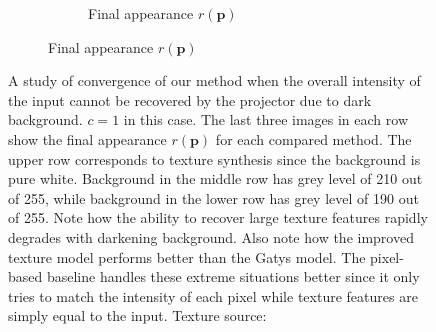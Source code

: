 \begin{figure}[]
\begin{subfigure}{\textwidth}
\begin{subfigure}{0.6\textwidth}
\begin{subfigure}{0.32\textwidth}
            \end{subfigure}
            \hfill
            \begin{subfigure}{0.32\textwidth}
                \centering
            \end{subfigure}
            \caption*{Final appearance \(r(\bm{p})\)}
            \vspace*{5mm}
        \end{subfigure}
        
    \end{subfigure}
    \caption{A study of convergence of our method when the overall intensity of the input cannot be recovered by the projector due to dark background. \(c = 1\) in this case. The last three images in each row show the final appearance \(r(\bm{p})\) for each compared method. The upper row corresponds to texture synthesis since the background is pure white. Background in the middle row has grey level of 210 out of 255, while background in the lower row has grey level of 190 out of 255. Note how the ability to recover large texture features rapidly degrades with darkening background. Also note how the improved texture model performs better than the Gatys model. The pixel-based baseline handles these extreme situations better since it only tries to match the intensity of each pixel while texture features are simply equal to the input. Texture source: \citet{Pixar128}}
    \label{fig:ex02-issues}
\end{figure}

